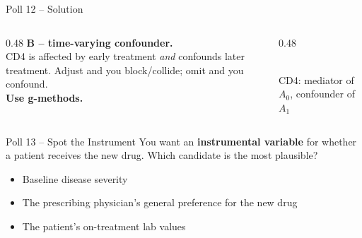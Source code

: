 \documentclass[aspectratio=169]{beamer}
\begin{document}
\begin{frame}{Poll 12 \;--\; Solution}
  \small
  \begin{columns}[T]
    \begin{column}{0.48\textwidth}
      \textcolor{good}{\textbf{B -- time-varying confounder.}}\\[0.4em]
      CD4 is affected by early treatment \emph{and} confounds later treatment.
      Adjust and you block/collide; omit and you confound.\\[0.2em]
      \textcolor{accent}{\textbf{Use g-methods.}}
    \end{column}
    \begin{column}{0.48\textwidth}
      \centering
      \\[0.2em]
      {\scriptsize CD4: mediator of $A_0$, confounder of $A_1$}
    \end{column}
  \end{columns}
\end{frame}

\begin{frame}{Poll 13 \;--\; Spot the Instrument}
  \small
  You want an \textbf{instrumental variable} for whether a patient receives the new drug.
  Which candidate is the most plausible?
  \vspace{0.8em}

  \begin{itemize}
    \item[\textbf{A.}] Baseline disease severity
    \item[\textbf{B.}] The prescribing physician's general preference for the new drug
    \item[\textbf{C.}] The patient's on-treatment lab values
  \end{itemize}
\end{frame}
\end{document}
